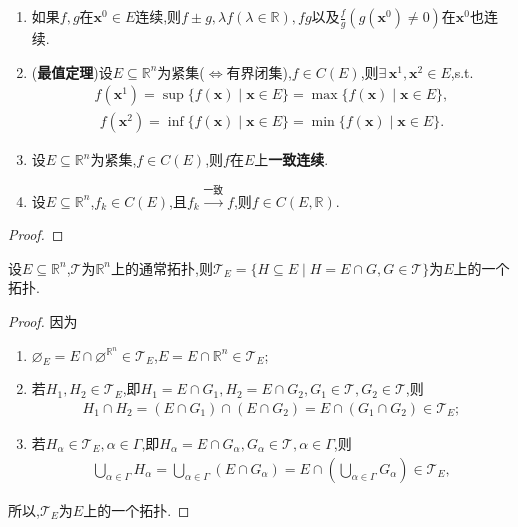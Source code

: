 \documentclass[../../main.tex]{subfiles}%
\begin{document}
\begin{theorem}
\begin{enumerate}[(1)]
\item 如果$f,g$在$\boldsymbol{x}^0\in E$连续,则$f\pm g,\lambda f(\lambda\in\mathbb{R}),fg$以及$\frac{f}{g}(g(\boldsymbol{x}^0)\neq0)$在$\boldsymbol{x}^0$也连续.

\item (\textbf{最值定理})设$E\subseteq\mathbb{R}^n$为紧集($\iff$有界闭集),$f\in C(E)$,则$\exists\,\boldsymbol{x}^1,\boldsymbol{x}^2\in E$,s.t.
\begin{align*}
f(\boldsymbol{x}^1)=\sup\{f(\boldsymbol{x})\mid \boldsymbol{x}\in E\}=\max\{f(\boldsymbol{x})\mid \boldsymbol{x}\in E\},
\end{align*}
\begin{align*}
f(\boldsymbol{x}^2)=\inf\{f(\boldsymbol{x})\mid \boldsymbol{x}\in E\}=\min\{f(\boldsymbol{x})\mid \boldsymbol{x}\in E\}.
\end{align*}
\item 设$E\subseteq\mathbb{R}^n$为紧集,$f\in C(E)$,则$f$在$E$上\textbf{一致连续}.

\item 设$E\subseteq\mathbb{R}^n$,$f_k\in C(E)$,且$f_k\stackrel{\text{一致}}{\to}f$,则$f\in C(E,\mathbb{R})$.
\end{enumerate}
\end{theorem}
\begin{proof}



\end{proof}

\begin{lemma}\label{lemma:实变函数--引理1.4.8}
设$E\subseteq\mathbb{R}^n$,$\mathscr{T}$为$\mathbb{R}^n$上的通常拓扑,则$\mathscr{T}_E=\{H\subseteq E\mid H=E\cap G,G\in\mathscr{T}\}$为$E$上的一个拓扑.
\end{lemma}
\begin{proof}

因为
\begin{enumerate}[(1)]
\item $\varnothing_E=E\cap\varnothing^{\mathbb{R}^n}\in\mathscr{T}_E$,$E=E\cap\mathbb{R}^n\in\mathscr{T}_E$;
\item 若$H_1,H_2\in\mathscr{T}_E$,即$H_1=E\cap G_1,H_2=E\cap G_2,G_1\in\mathscr{T},G_2\in\mathscr{T}$,则
\begin{align*}
H_1\cap H_2=(E\cap G_1)\cap(E\cap G_2)=E\cap(G_1\cap G_2)\in\mathscr{T}_E;
\end{align*}
\item 若$H_{\alpha}\in\mathscr{T}_E,\alpha\in\Gamma$,即$H_{\alpha}=E\cap G_{\alpha},G_{\alpha}\in\mathscr{T},\alpha\in\Gamma$,则
\begin{align*}
\bigcup_{\alpha\in\Gamma}H_{\alpha}=\bigcup_{\alpha\in\Gamma}(E\cap G_{\alpha})=E\cap\left(\bigcup_{\alpha\in\Gamma}G_{\alpha}\right)\in\mathscr{T}_E,
\end{align*}
\end{enumerate}
所以,$\mathscr{T}_E$为$E$上的一个拓扑.

\end{proof}
\end{document}

